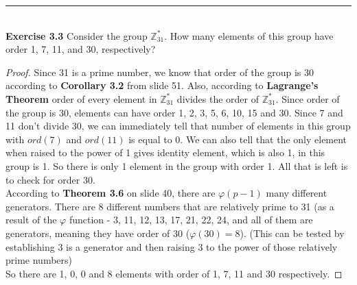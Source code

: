 \documentclass{article}
\begin{document}
\noindent\rule{12cm}{0.4pt}\\
\noindent \textbf{Exercise 3.3} Consider the group $\mathbb{Z}^{*}_{31}$. How many elements of this group have order 1, 7, 11, and 30, respectively?
\begin{proof}
Since 31 is a prime number, we know that order of the group is 30 according to \textbf{Corollary 3.2} from slide 51. Also, according to \textbf{Lagrange's Theorem} order of every element in $\mathbb{Z}^{*}_{31}$ divides the order of $\mathbb{Z}^{*}_{31}$. Since order of the group is 30, elements can have order 1, 2, 3, 5, 6, 10, 15 and 30. Since 7 and 11 don't divide 30, we can immediately tell that number of elements in this group with $ord(7)$ and $ord(11)$ is equal to 0. We can also tell that the only element when raised to the power of 1 gives identity element, which is also 1, in this group is 1. So there is only 1 element in the group with order 1. All that is left is to check for order 30.\\
According to \textbf{Theorem 3.6} on slide 40, there are $\varphi(p - 1)$ many different generators. There are 8 different numbers that are relatively prime to 31 (as a result of the $\varphi$ function - 3, 11, 12, 13, 17, 21, 22, 24, and all of them are generators, meaning they have order of 30 ($\varphi(30)=8$). (This can be tested by establishing 3 is a generator and then raising 3 to the power of those relatively prime numbers)\\
So there are 1, 0, 0 and 8 elements with order of 1, 7, 11 and 30 respectively.
\end{proof}
\end{document}
